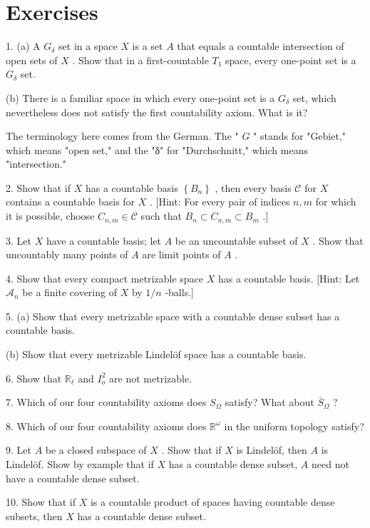\documentclass[10pt]{article}
\begin{document}
\section*{Exercises}

1. (a) A \({G}_{\delta }\) set in a space \(X\) is a set \(A\) that equals a countable intersection of open sets of \(X\) . Show that in a first-countable \({T}_{1}\) space, every one-point set is a \({G}_{\delta }\) set.

(b) There is a familiar space in which every one-point set is a \({G}_{\delta }\) set, which nevertheless does not satisfy the first countability axiom. What is it?

The terminology here comes from the German. The " \(G\) " stands for "Gebiet," which means "open set," and the "δ" for "Durchschnitt," which means "intersection."

2. Show that if \(X\) has a countable basis \(\left\{  {B}_{n}\right\}\) , then every basis \(\mathcal{C}\) for \(X\) contains a countable basis for \(X\) . [Hint: For every pair of indices \(n,m\) for which it is possible, choose \({C}_{n,m} \in  \mathcal{C}\) such that \({B}_{n} \subset  {C}_{n,m} \subset  {B}_{m}\) .]

3. Let \(X\) have a countable basis; let \(A\) be an uncountable subset of \(X\) . Show that uncountably many points of \(A\) are limit points of \(A\) .

4. Show that every compact metrizable space \(X\) has a countable basis. [Hint: Let \({\mathcal{A}}_{n}\) be a finite covering of \(X\) by \(1/n\) -balls.]

5. (a) Show that every metrizable space with a countable dense subset has a countable basis.

(b) Show that every metrizable Lindelöf space has a countable basis.

6. Show that \({\mathbb{R}}_{\ell }\) and \({I}_{o}^{2}\) are not metrizable.

7. Which of our four countability axioms does \({S}_{\Omega }\) satisfy? What about \({\bar{S}}_{\Omega }\) ?

8. Which of our four countability axioms does \({\mathbb{R}}^{\omega }\) in the uniform topology satisfy?

9. Let \(A\) be a closed subspace of \(X\) . Show that if \(X\) is Lindelöf, then \(A\) is Lindelöf. Show by example that if \(X\) has a countable dense subset, \(A\) need not have a countable dense subset.

10. Show that if \(X\) is a countable product of spaces having countable dense subsets, then \(X\) has a countable dense subset.
\end{document}
